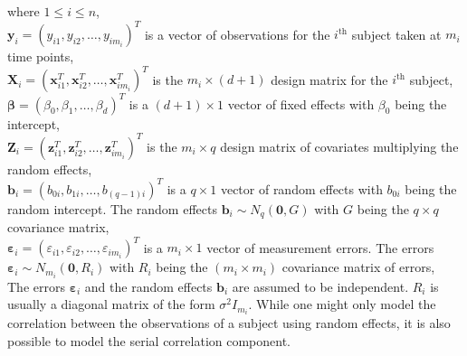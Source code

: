 where $1 \le i \le n$,\\
$\boldsymbol{y}_i = {(y_{i1}, y_{i2}, \ldots, y_{im_i})}^T$ is a vector of observations for the $i^\text{th}$ subject taken at $m_i$ time points,\\
$\boldsymbol{X}_i = {(\boldsymbol{x}_{i1}^T, \boldsymbol{x}_{i2}^T, \ldots, \boldsymbol{x}_{im_i}^T)}^T$ is the $m_i \times (d+1)$ design matrix for the $i^\text{th}$ subject,\\
$\boldsymbol{\beta} = {(\beta_0, \beta_1, \ldots, \beta_d)}^T$ is a $(d+1) \times 1$ vector of fixed effects with $\beta_0$ being the intercept,\\
$\boldsymbol{Z}_i = {(\boldsymbol{z}_{i1}^T, \boldsymbol{z}_{i2}^T, \ldots, \boldsymbol{z}_{im_i}^T)}^T$ is the $m_i \times q$ design matrix of covariates multiplying the random effects,\\
$\boldsymbol{b}_i = {(b_{0i}, b_{1i}, \ldots, b_{(q-1)i})}^T$ is a $q \times 1$ vector of random effects with $b_{0i}$ being the random intercept. The random effects $\boldsymbol{b}_i \sim N_q(\boldsymbol{0}, G)$ with $G$ being the $q \times q$ covariance matrix,\\ 
$\boldsymbol{\varepsilon}_{i} = {(\varepsilon_{i1}, \varepsilon_{i2}, \ldots, \varepsilon_{im_i})}^T$ is a $m_i \times 1$ vector of measurement errors. The errors $\boldsymbol{\varepsilon}_{i} \sim N_{m_i}(\boldsymbol{0}, R_i)$ with $R_i$ being the $(m_i \times m_i)$ covariance matrix of errors,\\

The errors $\boldsymbol{\varepsilon}_{i}$ and the random effects $\boldsymbol{b}_i$ are assumed to be independent. $R_i$ is usually a diagonal matrix of the form $\sigma^2I_{m_i}$. While one might only model the correlation between the observations of a subject using random effects, it is also possible to model the serial correlation component.

